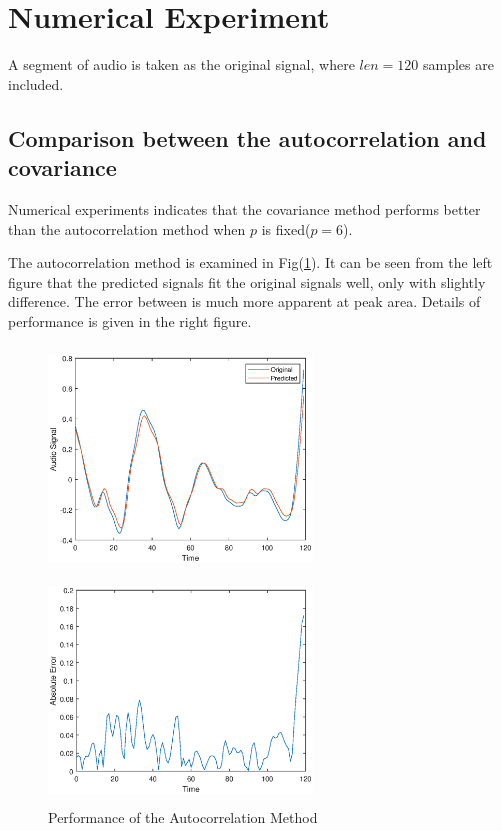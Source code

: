 \documentclass[preprint,12pt]{elsarticle}
\begin{document}
\section{Numerical Experiment}
A segment of audio is taken as the original signal, where $len = 120$ samples are included. 
\subsection{Comparison between the autocorrelation and covariance}
Numerical experiments indicates that the covariance method performs better than the autocorrelation method when $p$ is fixed($p=6$).

The autocorrelation method is examined in Fig(\ref{fig:performance_auto}). It can be seen from the left figure that the predicted signals fit the original signals well, only with slightly difference. The error between is much more apparent at peak area. Details of performance is given in the right figure.

\begin{figure}[!htbp]\centering	
	\begin{minipage}{6.5cm}
		\centering
		\includegraphics[height=6cm,width=7cm]{../pic/autocorrelation_120_6.eps}
	\end{minipage}
	\begin{minipage}{6.5cm}
		\centering
		\includegraphics[height=6cm,width=7cm]{../pic/autocorrelation_err_120_6.eps}
	\end{minipage}
	\caption{Performance of the Autocorrelation Method}\label{fig:performance_auto}
\end{figure}
\end{document}
